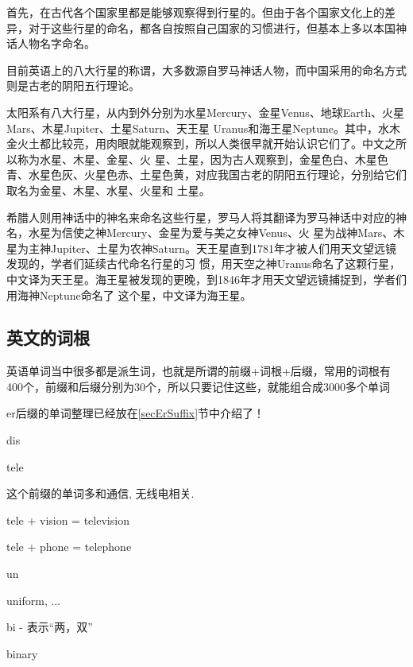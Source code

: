 \documentclass[a4paper]{article}
\begin{document}
首先，在古代各个国家里都是能够观察得到行星的。但由于各个国家文化上的差异，对于这些行星的命名，都各自按照自己国家的习惯进行，但基本上多以本国神话人物名字命名。

目前英语上的八大行星的称谓，大多数源自罗马神话人物，而中国采用的命名方式则是古老的阴阳五行理论。



太阳系有八大行星，从内到外分别为水星Mercury、金星Venus、地球Earth、火星Mars、木星Jupiter、土星Saturn、天王星
Uranus和海王星Neptune。其中，水木金火土都比较亮，用肉眼就能观察到，所以人类很早就开始认识它们了。中文之所以称为水星、木星、金星、火
星、土星，因为古人观察到，金星色白、木星色青、水星色灰、火星色赤、土星色黄，对应我国古老的阴阳五行理论，分别给它们取名为金星、木星、水星、火星和
土星。

希腊人则用神话中的神名来命名这些行星，罗马人将其翻译为罗马神话中对应的神名，水星为信使之神Mercury、金星为爱与美之女神Venus、火
星为战神Mars、木星为主神Jupiter、土星为农神Saturn。天王星直到1781年才被人们用天文望远镜发现的，学者们延续古代命名行星的习
惯，用天空之神Uranus命名了这颗行星，中文译为天王星。海王星被发现的更晚，到1846年才用天文望远镜捕捉到，学者们用海神Neptune命名了
这个星，中文译为海王星。


  \subsection{英文的词根}\label{secCiGeng}
英语单词当中很多都是派生词，也就是所谓的前缀+词根+后缀，常用的词根有400个，前缀和后缀分别为30个，所以只要记住这些，就能组合成3000多个单词


er后缀的单词整理已经放在\ref{secErSuffix}节中介绍了！




dis

tele

这个前缀的单词多和通信, 无线电相关.

tele + vision = television

tele + phone = telephone

un

uniform, ...

bi - 表示“两，双”

binary
\end{document}
